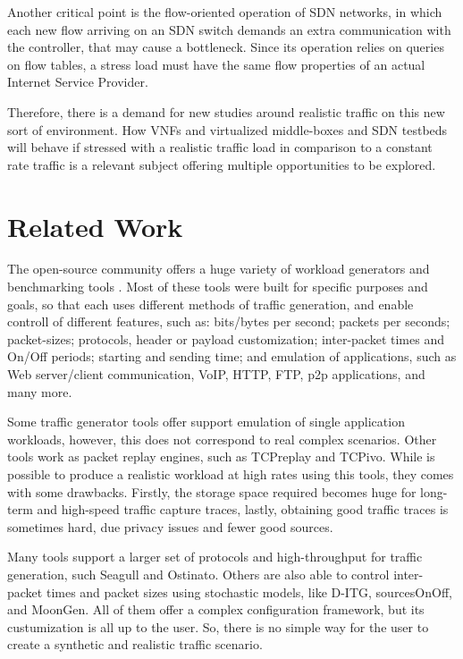 Another critical point is the flow-oriented operation of SDN networks, in which each new flow arriving on an SDN switch demands an extra communication with the controller, that may cause a bottleneck. Since its operation relies on queries on flow tables, a stress load must have the same flow properties of an actual Internet Service Provider. 

Therefore, there is a demand for new studies around realistic traffic on this new sort of environment. How VNFs and virtualized middle-boxes and SDN testbeds will behave if stressed with a realistic traffic load in comparison to a constant rate traffic is a relevant subject offering multiple opportunities to be explored.



\section{Related Work}


The open-source community offers a huge variety of workload generators and benchmarking tools \cite{ditg-paper}\cite{validate-trafficgen}\cite{comparative-trafficgen-tools}\cite{performance-trafficgen}. Most of these tools were built for specific purposes and goals, so that each uses different methods of traffic generation, and enable controll of different features, such as: bits/bytes per second; packets per seconds; packet-sizes; protocols, header or payload customization; inter-packet times and On/Off periods; starting and sending time; and emulation of applications, such as Web server/client communication, VoIP, HTTP, FTP, p2p applications, and many more.


Some traffic generator tools offer support emulation of single application workloads, however, this does not correspond to real complex scenarios. Other tools work as packet replay engines, such as TCPreplay and TCPivo. While is possible to produce a realistic workload at high rates using this tools, they comes with some drawbacks. Firstly, the storage space required becomes huge for long-term and high-speed traffic capture traces, lastly, obtaining good traffic traces is sometimes hard, due privacy issues and fewer good sources. 


Many tools support a larger set of protocols and high-throughput for traffic generation, such Seagull and Ostinato. Others are also able to control inter-packet times and packet sizes using stochastic models, like D-ITG\cite{ditg-paper}, sourcesOnOff\cite{sourcesonoff-paper}, and MoonGen. All of them offer a complex configuration framework, but its custumization is all up to the user. So, there is no simple way for the user to create a synthetic and realistic traffic scenario. 

